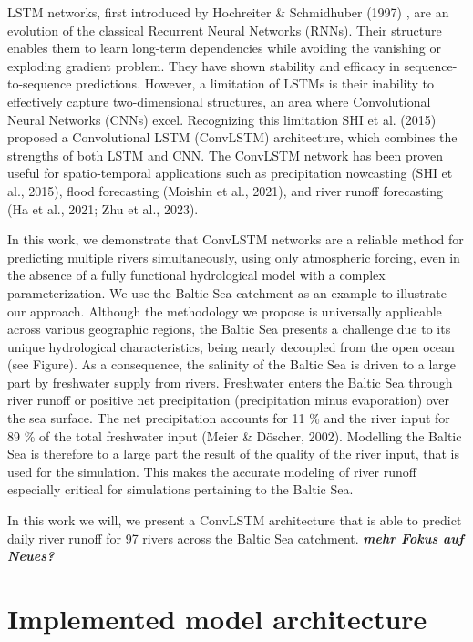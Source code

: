 \documentclass[
]{agujournal2019}
\begin{document}
LSTM networks, first introduced by Hochreiter \& Schmidhuber (1997) ,
are an evolution of the classical Recurrent Neural Networks (RNNs).
Their structure enables them to learn long-term dependencies while
avoiding the vanishing or exploding gradient problem. They have shown
stability and efficacy in sequence-to-sequence predictions. However, a
limitation of LSTMs is their inability to effectively capture
two-dimensional structures, an area where Convolutional Neural Networks
(CNNs) excel. Recognizing this limitation SHI et al. (2015) proposed a
Convolutional LSTM (ConvLSTM) architecture, which combines the strengths
of both LSTM and CNN. The ConvLSTM network has been proven useful for
spatio-temporal applications such as precipitation nowcasting (SHI et
al., 2015), flood forecasting (Moishin et al., 2021), and river runoff
forecasting (Ha et al., 2021; Zhu et al., 2023).

In this work, we demonstrate that ConvLSTM networks are a reliable
method for predicting multiple rivers simultaneously, using only
atmospheric forcing, even in the absence of a fully functional
hydrological model with a complex parameterization. We use the Baltic
Sea catchment as an example to illustrate our approach. Although the
methodology we propose is universally applicable across various
geographic regions, the Baltic Sea presents a challenge due to its
unique hydrological characteristics, being nearly decoupled from the
open ocean (see Figure). As a consequence, the salinity of the Baltic
Sea is driven to a large part by freshwater supply from rivers.
Freshwater enters the Baltic Sea through river runoff or positive net
precipitation (precipitation minus evaporation) over the sea surface.
The net precipitation accounts for 11 \% and the river input for 89 \%
of the total freshwater input (Meier \& Döscher, 2002). Modelling the
Baltic Sea is therefore to a large part the result of the quality of the
river input, that is used for the simulation. This makes the accurate
modeling of river runoff especially critical for simulations pertaining
to the Baltic Sea.

In this work we will, we present a ConvLSTM architecture that is able to
predict daily river runoff for 97 rivers across the Baltic Sea
catchment. \textbf{\emph{mehr Fokus auf Neues?}}

\section{Implemented model
architecture}\label{implemented-model-architecture}
\end{document}
